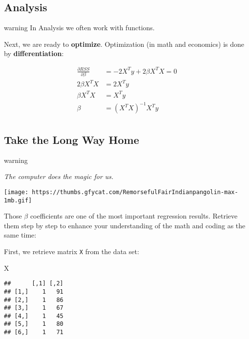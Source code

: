\documentclass[
]{book}
\newenvironment{Shaded}{\begin{snugshade}}{\end{snugshade}}
\newcommand{\NormalTok}[1]{#1}
\begin{document}
\hypertarget{analysis}{%
\subsection{Analysis}\label{analysis}}

\begin{infobox}warning
In Analysis we often work with functions.

\end{infobox}

Next, we are ready to \textbf{optimize}. Optimization (in math and economics) is done by \textbf{differentiation}:

\[\begin{align}
    \frac{\partial RSS}{\partial \beta} &= -2 X^T y + 2 \beta X^T X = 0 \tag{first derivative equal to zero} \\
    2 \beta X^T X &= 2 X^T y \tag{rearrange terms}\\
    \beta X^T X &= X^T y \tag{the "normal equation"} \\
    \beta &= (X^T X)^{-1} X^T y \tag{Bam}\\
\end{align}\]

\hypertarget{take-the-long-way-home}{%
\subsection{Take the Long Way Home}\label{take-the-long-way-home}}

\begin{infobox}warning

\emph{The computer does the magic for us.}

\texttt{[image: https://thumbs.gfycat.com/RemorsefulFairIndianpangolin-max-1mb.gif]}

\end{infobox}

Those \(\beta\) coefficients are one of the most important regression results. Retrieve them step by step to enhance your understanding of the math and coding as the same time:

First, we retrieve matrix \texttt{X} from the data set:

\begin{Shaded}
\begin{Highlighting}[]
\NormalTok{X}
\end{Highlighting}
\end{Shaded}

\begin{verbatim}
##      [,1] [,2]
## [1,]    1   91
## [2,]    1   86
## [3,]    1   67
## [4,]    1   45
## [5,]    1   80
## [6,]    1   71
\end{verbatim}
\end{document}
